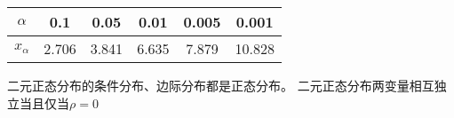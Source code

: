 \begin{table}[H]
    \centering
    \begin{tabular}{|c|c|c|c|c|c|}
        \hline
        \(\alpha\) & 0.1   & 0.05  & 0.01  & 0.005 & 0.001  \\
        \hline
        \(x_{\alpha}\) & 2.706 & 3.841 & 6.635 & 7.879 & 10.828 \\
        \hline
    \end{tabular}
\end{table}


二元正态分布的条件分布、边际分布都是正态分布。
二元正态分布两变量相互独立当且仅当\(\rho=0\)

